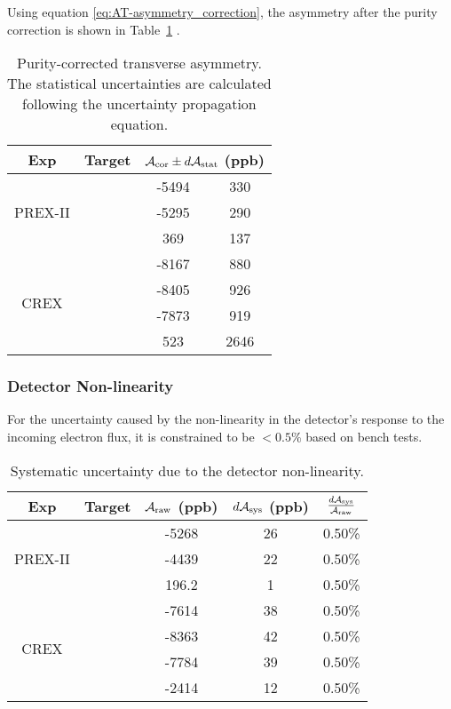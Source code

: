 Using equation \ref{eq:AT-asymmetry_correction}, the asymmetry after the purity correction
is shown in Table~\ref{tab:purity_corrected_asymmetry} .
\begin{table}
    \centering
    \begin{tabular}{c c | c c }
	\hline
	Exp & Target	
	& \multicolumn{2}{c}{$\mathcal{A}_{\text{cor}}  \pm d\mathcal{A}_{\text{stat}}$ (ppb)}	    \\
	\hline
	\multirow{3}{*}{PREX-II}
	    & \Carbon    & -5494	& 330	 \\ 
	    & \Ca   & -5295	& 290	 \\ 
	    & \Pb   & 369	& 137	 \\ 
	\hline
	\multirow{4}{*}{CREX}
	    & \Carbon    & -8167	& 880	 \\ 
	    & \ca   & -8405	& 926	 \\ 
	    & \Ca   & -7873	& 919	 \\ 
	    & \Pb   & 523	& 2646	 \\ 
	\hline
    \end{tabular}
    \caption{Purity-corrected transverse asymmetry. The statistical uncertainties
    are calculated following the uncertainty propagation equation.}
    \label{tab:purity_corrected_asymmetry}
\end{table}

\subsubsection{Detector Non-linearity}
For the uncertainty caused by the non-linearity in the detector's response 
to the incoming electron flux, it is constrained to be $<0.5\%$ based on bench tests.
\begin{table}[!h]
    \centering
    \begin{tabular}{c c | c c c}
	\hline
	Exp & Target	& $\mathcal{A}_{\text{raw}}$ (ppb) & $d\mathcal{A}_{\text{sys}}$ (ppb)    & $\frac{d\mathcal{A}_{\text{sys}}}{\mathcal{A}_{\text{raw}}}$   \\
	\hline
	\multirow{3}{*}{PREX-II}
	    & \Carbon    & -5268	& 26	& 0.50\%    \\ 
	    & \ca   & -4439	& 22	& 0.50\%    \\ 
	    & \Pb   & 196.2	& 1	& 0.50\%    \\ 
	\hline
	\multirow{4}{*}{CREX}
	    & \Carbon    & -7614	& 38	& 0.50\%    \\ 
	    & \ca   & -8363	& 42	& 0.50\%    \\ 
	    & \Ca   & -7784	& 39	& 0.50\%    \\ 
	    & \Pb   & -2414	& 12	& 0.50\%    \\ 
	\hline
    \end{tabular}
    \caption{Systematic uncertainty due to the detector non-linearity.}
\end{table}

